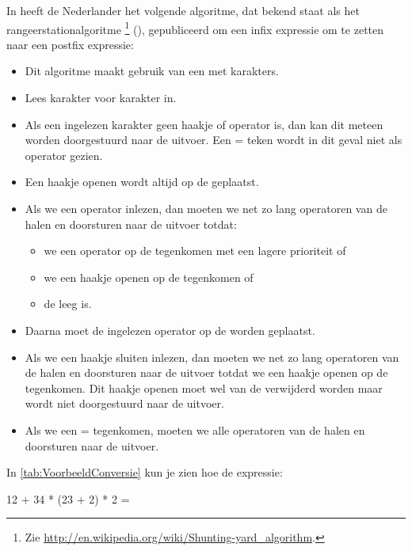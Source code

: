 \begin{cpplstShortInline}
In \citeyear{Dijkstra1961} heeft de Nederlander \citeauthor{Dijkstra1961} het volgende algoritme, dat bekend staat als het rangeerstationalgoritme%
\footnote{%
	Zie \url{http://en.wikipedia.org/wiki/Shunting-yard_algorithm}.
} 
(), gepubliceerd \cite{Dijkstra1961} om een infix expressie om te zetten naar een postfix expressie:
\begin{itemize}
	\item Dit algoritme maakt gebruik van een  met karakters.
	\item Lees karakter voor karakter in.
	\item Als een ingelezen karakter geen haakje of operator is, dan kan dit meteen worden doorgestuurd naar de uitvoer.
	Een = teken wordt in dit geval niet als operator gezien.
	\item Een haakje openen wordt altijd op de  geplaatst.
	\item Als we een operator inlezen, dan moeten we net zo lang operatoren van de  halen en doorsturen naar de uitvoer totdat:
	\begin{itemize}
		\item we een operator op de  tegenkomen met een lagere prioriteit of
		\item we een haakje openen op de  tegenkomen of
		\item de  leeg is.
	\end{itemize}
	\item Daarna moet de ingelezen operator op de  worden geplaatst.
	\item Als we een haakje sluiten inlezen, dan moeten we net zo lang operatoren van de  halen en doorsturen naar de uitvoer totdat we een haakje openen op de  tegenkomen.
	Dit haakje openen moet wel van de  verwijderd worden maar wordt niet doorgestuurd naar de uitvoer.
	\item Als we een = tegenkomen, moeten we alle operatoren van de  halen en doorsturen naar de uitvoer.
\end{itemize}

In \cref{tab:VoorbeeldConversie} kun je zien hoe de expressie:

\begin{coutput}
12 + 34 * (23 + 2) * 2 =
\end{coutput}


\end{cpplstShortInline}
